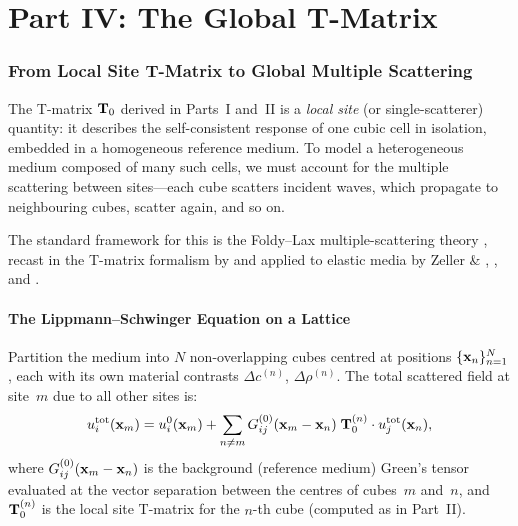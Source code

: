 
\part*{Part IV: The Global T-Matrix}

\section{From Local Site T-Matrix to Global Multiple Scattering}

The T-matrix $\mathbf{T}_0$ derived in Parts~I and~II is a \emph{local site} (or
single-scatterer) quantity: it describes the self-consistent response of one
cubic cell in isolation, embedded in a homogeneous reference medium.  To
model a heterogeneous medium composed of many such cells, we must account
for the multiple scattering between sites---each cube scatters incident
waves, which propagate to neighbouring cubes, scatter again, and so on.

The standard framework for this is the Foldy--Lax multiple-scattering
theory \citep{Foldy1945,Lax1952}, recast in the T-matrix formalism by
\citet{Waterman1976} and applied to elastic media by Zeller \&
\citet{ZellerDederichs1973},
\citet{Gubernatis1977}, and \citet{Jakobsen2012}.

\subsection{The Lippmann--Schwinger Equation on a Lattice}

Partition the medium into $N$ non-overlapping cubes centred at positions
$\{\mathbf{x}_n\}_{n=1}^N$, each with its own material contrasts
$\Delta c^{(n)}$, $\Delta\rho^{(n)}$.  The total scattered field at site~$m$
due to all other sites is:
\begin{equation}
  u_i^{\text{tot}}(\mathbf{x}_m)
  = u_i^0(\mathbf{x}_m)
  + \sum_{n\neq m}
    G_{ij}^{(0)}(\mathbf{x}_m - \mathbf{x}_n)\;\mathbf{T}_0^{(n)}\cdot u_j^{\text{tot}}(\mathbf{x}_n),
\label{eq:latticeLS}
\end{equation}
where $G_{ij}^{(0)}(\mathbf{x}_m - \mathbf{x}_n)$ is the background (reference medium)
Green's tensor evaluated at the vector separation between the centres of
cubes~$m$ and~$n$, and $\mathbf{T}_0^{(n)}$ is the local site T-matrix for the
$n$-th cube (computed as in Part~II).

